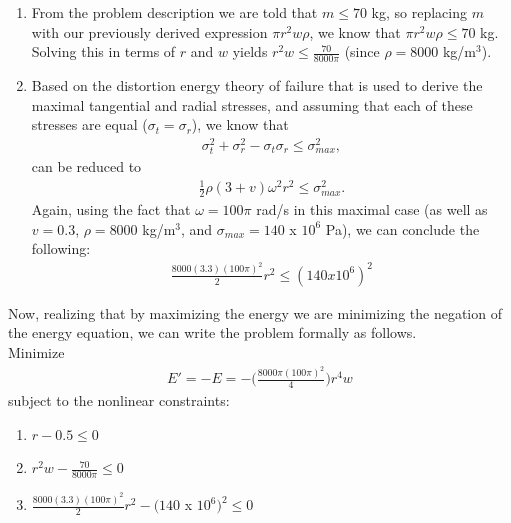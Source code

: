 \documentclass[11pt]{article}
\begin{document}
\begin{solution}
\begin{enumerate}
	\item From the problem description we are told that $m \leq 70$ kg, so replacing $m$ with our previously derived expression $\pi r^2 w \rho$, we know that $\pi r^2 w \rho \leq 70$ kg. Solving this in terms of $r$ and $w$ yields $r^2 w \leq \frac{70}{8000\pi}$ (since $\rho = 8000$ kg/m$^3$).
	\item Based on the distortion energy theory of failure that is used to derive the maximal tangential and radial stresses, and assuming that each of these stresses are equal ($\sigma_t = \sigma_r$), we know that
\begin{eqnarray*}
\sigma_t^2 + \sigma_r^2 - \sigma_t\sigma_r \leq \sigma_{max}^2, 
\end{eqnarray*}
can be reduced to
\begin{eqnarray*}
\frac{1}{2}\rho(3 + v)\omega^2r^2 \leq \sigma_{max}^2.
\end{eqnarray*}
Again, using the fact that $\omega = 100\pi$ rad/s in this maximal case (as well as $v = 0.3$, $\rho = 8000$ kg/m$^3$, and $\sigma_{max} = 140$ x $10^6$ Pa), we can conclude the following:
\begin{eqnarray*}
\frac{8000(3.3)(100\pi)^2}{2}r^2 \leq (140 x 10^6)^2
\end{eqnarray*}
\end{enumerate}
Now, realizing that by maximizing the energy we are minimizing the negation of the energy equation, we can write the problem formally as follows. \\

Minimize
\begin{eqnarray*}
E' = -E = -\Big(\frac{8000\pi(100\pi)^2}{4}\Big)r^4 w
\end{eqnarray*}
subject to the nonlinear constraints:
\begin{enumerate}
	\item $r - 0.5 \leq 0$
	\item $r^2 w  - \frac{70}{8000\pi} \leq 0$
	\item $\frac{8000(3.3)(100\pi)^2}{2}r^2 - (140$ x $10^6)^2 \leq 0$
\end{enumerate}
\end{solution}
\end{document}
